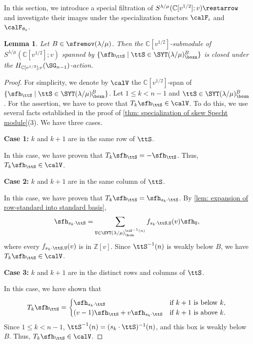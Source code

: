 \documentclass[12pt, reqno]{amsart}
\theoremstyle{plain}
\newtheorem{lemma}[lemma]{Lemma}
\theoremstyle{definition}
\numberwithin{equation}{section}
\numberwithin{figure}{section}
\numberwithin{table}{section}
\def\Z{\mathbb Z}
\def\C{\mathbb C}
\begin{document}
In this section, we introduce a special  filtration of $S^{\lambda/\mu}(\C[v^{1/2}];v)\restarrow$ and investigate their images under the specialization functors $\calF_{\iota}$ and $\calF_{\theta_0}$.  





\begin{lemma}\label{lem: skew Specht submodule n-1}
Let $B \in \sfremov(\lambda/\mu)$.  Then the $\C[v^{1/2}]$-submodule of $S^{\lambda/\mu}(\C[v^{1/2}];v)$ spanned by $\{\sfh_{\ttS} \mid \ttS \in \SYT(\lambda/\mu)^B_{\boxn} \}$
is closed under the $H_{\C[v^{1/2}];v}(\SG_{n-1})$-action. 
\end{lemma}

\begin{proof}
For simplicity, we denote by $\calV$  the $\C[v^{1/2}]$-span of $\{\sfh_{\ttS} \mid \ttS \in \SYT(\lambda/\mu)^B_{\boxn} \}$.
Let $1 \le k < n-1$ and $\ttS \in \SYT(\lambda/\mu)^B_{\boxn}$.
For the assertion, we have to prove that $T_k \sfh_{\ttS} \in \calV$. 
To do this, we use several facts established in the proof of \cref{thm: specialization of skew Specht module}(3).
We have  three cases.

{\bf Case 1:} $k$ and $k+1$ are in the same row of $\ttS$.

In this case, we have proven that $T_k \sfh_{\ttS} = - \sfh_{\ttS}$.
Thus, $T_k \sfh_{\ttS} \in \calV$.


{\bf Case 2:} $k$ and $k+1$ are in the same column of $\ttS$.

In this case, we have proven that $T_k \sfh_{\ttS} = \sfh_{s_k \cdot \ttS}$.
By \cref{lem: expansion of row-standard into standard basis},
\[
\sfh_{s_k \cdot \ttS}
= \sum_{\mathtt{U} \in \SYT(\lambda/\mu)^{\ttS^{-1}(n)}_{\boxn}}
f_{s_k \cdot \ttS, \mathtt{U}}(v) \sfh_{\mathtt{U}},
\]
where every $f_{s_k \cdot \ttS, \mathtt{U}}(v)$ is in $\Z[v]$.
Since $\ttS^{-1}(n)$ is weakly below $B$, we have $T_k \sfh_{\ttS} \in \calV$.

{\bf Case 3:} $k$ and $k+1$ are in the distinct rows and columns of $\ttS$.

In this case, we have shown that
\[
T_k \sfh_{\ttS} =
\begin{cases}
\sfh_{s_k \cdot \ttS} 
& \text{if $k+1$ is below $k$,} \\
(v-1)\sfh_\ttS + v \sfh_{s_k \cdot \ttS}
& \text{if $k+1$ is above $k$.}
\end{cases}
\]
Since $1 \le k < n-1$, $\ttS^{-1}(n) = (s_k \cdot \ttS)^{-1}(n)$, and this box is weakly below $B$.
Thus, $T_k \sfh_{\ttS} \in \calV$.
\end{proof}
\end{document}
